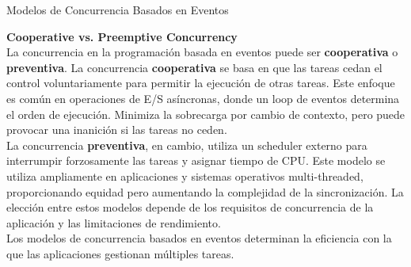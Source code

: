 \documentclass[11pt]{beamer}
\begin{document}
	\begin{frame}{Modelos de Concurrencia Basados en Eventos}
		
		\textbf{Cooperative vs. Preemptive Concurrency} \\
		\vspace{0.4cm}
		\justifying \small 
		La concurrencia en la programación basada en eventos puede ser \textbf{cooperativa} o \textbf{preventiva}. La concurrencia \textbf{cooperativa} se basa en que las tareas cedan el control voluntariamente para permitir la ejecución de otras tareas. Este enfoque es común en operaciones de E/S asíncronas, donde un loop de eventos determina el orden de ejecución. Minimiza la sobrecarga por cambio de contexto, pero puede provocar una inanición si las tareas no ceden.\\
		La concurrencia \textbf{preventiva}, en cambio, utiliza un scheduler externo para interrumpir forzosamente las tareas y asignar tiempo de CPU. Este modelo se utiliza ampliamente en aplicaciones y sistemas operativos multi-threaded, proporcionando equidad pero aumentando la complejidad de la sincronización. La elección entre estos modelos depende de los requisitos de concurrencia de la aplicación y las limitaciones de rendimiento. \\
		Los modelos de concurrencia basados en eventos determinan la eficiencia con la que las aplicaciones gestionan múltiples tareas. 
	\end{frame}
	
\end{document}
